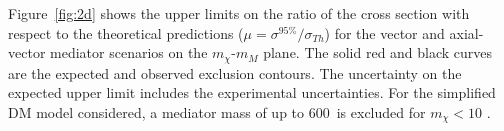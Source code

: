 %



Figure~\ref{fig:2d} shows the upper limits on the ratio of the cross section with respect
to the theoretical predictions ($\mu=
\sigma^{95\%}/\sigma_{Th}$) for the vector and axial-vector
mediator scenarios on the $m_\chi$-$m_M$ plane. The solid red and 
black curves are the expected and observed exclusion contours. The uncertainty on the 
expected upper limit includes the experimental uncertainties. For the simplified DM model
considered, a mediator mass of up to 600~\GeV is excluded for $m_\chi <10$ \GeV.

